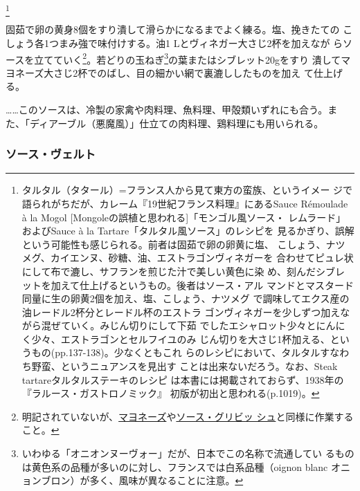 \begin{recette}
\footnote{タルタル（タタール）=フランス人から見て東方の蛮族、というイメー
  ジで語られがちだが、カレーム『19世紀フランス料理』にあるSauce
  Rémoulade à la Mogol {[}Mongoleの誤植と思われる{]}「モンゴル風ソース・
  レムラード」およびSauce à la Tartare「タルタル風ソース」のレシピを
  見るかぎり、誤解という可能性も感じられる。前者は固茹で卵の卵黄に塩、
  こしょう、ナツメグ、カイエンヌ、砂糖、油、エストラゴンヴィネガーを
  合わせてピュレ状にして布で漉し、サフランを煎じた汁で美しい黄色に染
  め、刻んだシブレットを加えて仕上げるというもの。後者はソース・アル
  マンドとマスタード同量に生の卵黄2個を加え、塩、こしょう、ナツメグ
  で調味してエクス産の油レードル2杯分とレードル\undemi{}杯のエストラ
  ゴンヴィネガーを少しずつ加えながら混ぜていく。みじん切りにして下茹
  でしたエシャロット少々とにんにく少々、エストラゴンとセルフイユのみ
  じん切りを大さじ1杯加える、というもの(pp.137-138)。少なくともこれ
  らのレシピにおいて、タルタルすなわち野蛮、というニュアンスを見出す
  ことは出来ないだろう。なお、Steak tartareタルタルステーキのレシピ
  は本書には掲載されておらず、1938年の『ラルース・ガストロノミック』
  初版が初出と思われる(p.1019)。}


固茹で卵の黄身8個をすり潰して滑らかになるまでよく練る。塩、挽きたての
こしょう各1つまみ強で味付けする。油1 Lとヴィネガー大さじ2杯を加えなが
らソースを立てていく\footnote{明記されていないが、\protect\hyperlink{mayonnaise}{マヨネーズ}や\protect\hyperlink{sauce-gribiche}{ソース・グリビッ
  シュ}と同様に作業すること。}。若どりの玉ねぎ\footnote{いわゆる「オニオンヌーヴォー」だが、日本でこの名称で流通してい
  るものは黄色系の品種が多いのに対し、フランスでは白系品種（oignon blanc
  オニョンブロン）が多く、風味が異なることに注意。}の葉またはシブレット20gをすり
潰してマヨネーズ大さじ2杯でのばし、目の細かい網で裏漉ししたものを加え
て仕上げる。

\ldots{}\ldots{}このソースは、冷製の家禽や肉料理、魚料理、甲殻類いずれにも合う。ま
た、「ディアーブル（悪魔風）」仕立ての肉料理、鶏料理にも用いられる。

\maeaki

\hypertarget{sauce-verte}{%
\subsubsection{ソース・ヴェルト}\label{sauce-verte}}


\end{recette}
